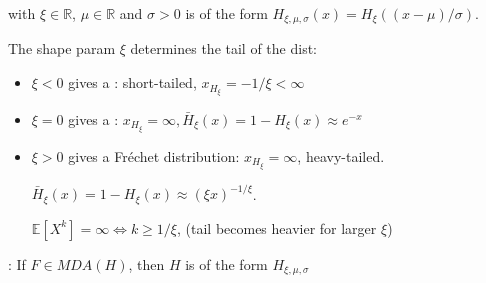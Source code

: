  with  $\xi \in \mathbb{R}$,  $\mu \in \mathbb{R}$ and  $\sigma>0$ is of the form $H_{\xi, \mu, \sigma}(x)=H_{\xi}((x-\mu) / \sigma)$.

The shape param $\xi$ determines the tail of the dist:
\begin{itemize}[leftmargin=*]
    \item $\xi<0$ gives a : short-tailed, $x_{H_{\xi}}=-1 / \xi<\infty$
    \item $\xi=0$ gives a : $x_{H_{\xi}}=\infty, \bar{H}_{\xi}(x)=1-H_{\xi}(x) \approx e^{-x}$
    \item $\xi>0$ gives a Fréchet distribution: $x_{H_{\xi}}=\infty$, heavy-tailed.
    
    $\bar{H}_{\xi}(x)=1-H_{\xi}(x) \approx(\xi x)^{-1 / \xi}$.
    
    $\mathbb{E}\left[X^{k}\right]=\infty \Leftrightarrow k \geq 1 / \xi$, (tail becomes heavier for larger $\xi$)
\end{itemize}

: 
If $F \in M D A(H)$, then $H$ is of the form $H_{\xi, \mu, \sigma}$



















